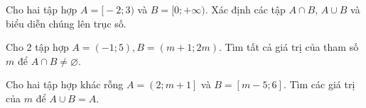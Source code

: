 \begin{bt}%
	Cho hai tập hợp $A=\big[-2;3\big)$ và $B=\big[0;+\infty\big)$. Xác định các tập $A\cap B$, $A\cup B$ và biểu diễn chúng lên trục số.
	\loigiai{
		Ta có $A\cup B=\left[-2;+\infty\right)$.
	}
\end{bt}

\begin{bt}%
	Cho 2 tập hợp $A=(-1 ; 5), B=(m+1 ; 2 m)$. Tìm tất cả giá trị của tham số $m$ để $A \cap B \neq \varnothing$.
\end{bt}

\begin{bt}%
	Cho hai tập hợp khác rỗng $A=\left(2;m+1\right]$ và $B=\left[m-5;6\right]$. Tìm các giá trị của $m$ để $A\cup B=A$.
\end{bt}


